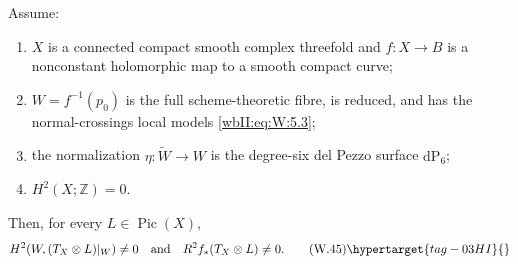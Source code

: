 \begin{theorem}
\hypertarget{tag-03IX}{}\label{wbII:thm:candidate-conductor}

Assume:
\begin{enumerate}[label=(H\arabic*)]
\item $X$ is a connected compact smooth complex threefold and
$f:X\to B$ is a nonconstant holomorphic map to a smooth compact curve;
\item $W=f^{-1}(p_0)$ is the full scheme-theoretic fibre, is reduced, and
has the normal-crossings local models \eqref{wbII:eq:W:5.3};
\item the normalization $\eta:\widetilde W\to W$ is the degree-six del
Pezzo surface $\mathrm{dP}_6$;
\item $H^2(X;\mathbb Z)=0$.
\end{enumerate}
Then, for every $L\in\operatorname{Pic}(X)$,
\[
H^2(W,(T_X\otimes L)|_W)\ne0
\quad\text{and}\quad
R^2f_*(T_X\otimes L)\ne0.
\tag{W.45}\hypertarget{tag-03HI}{}\label{wbII:eq:W:5.18}
\]
\end{theorem}



